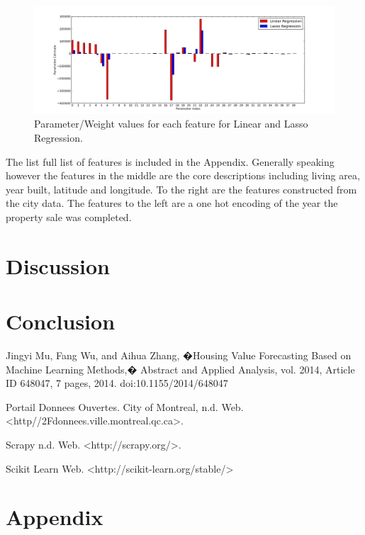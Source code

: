 \documentclass{acm_proc_article-sp}
\begin{document}
	 \begin{figure}[!htbp]
   		\centering
  		\includegraphics[width=\textwidth]{parameter_values.png}
    		\caption{Parameter/Weight values for each feature for Linear and Lasso Regression.}
    		\label{fig:feats}
	\end{figure}
	
	The list full list of features is included in the Appendix. Generally speaking however the features in the middle are the core descriptions including living area, year built, latitude and longitude. To the right are the features constructed from the city data. The features to the left are a one hot encoding of the year the property sale was completed.

\section{Discussion}
	
\section{Conclusion}
\begin{thebibliography}{9}

  Jingyi Mu, Fang Wu, and Aihua Zhang, �Housing Value Forecasting Based on Machine Learning Methods,� Abstract and Applied Analysis, vol. 2014, Article ID 648047, 7 pages, 2014. doi:10.1155/2014/648047
  
	Portail Donnees Ouvertes. City of Montreal, n.d. Web. <http//2Fdonnees.ville.montreal.qc.ca>.
	
	Scrapy n.d. Web. <http://scrapy.org/>.
	
 	Scikit Learn Web. <http://scikit-learn.org/stable/>

\end{thebibliography}

\section{Appendix}
\end{document}
